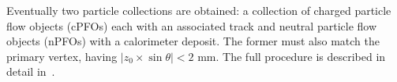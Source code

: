   	  Eventually two particle collections are obtained: a collection of charged particle flow objects (cPFOs) each with an associated track and neutral particle flow objects (nPFOs) with a calorimeter deposit. The former must also match the primary vertex, having $|z_0\times \sin{\theta}| < 2$ mm. The full procedure is described in detail in~\cite{pflow}.